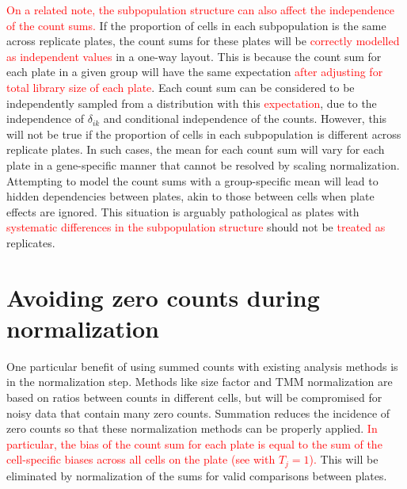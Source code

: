 \documentclass{article}
\newcommand\revised[1]{\textcolor{red}{#1}}
\begin{document}
\revised{On a related note, the subpopulation structure can also affect the independence of the count sums.}
If the proportion of cells in each subpopulation is the same across replicate plates, the count sums for these plates will be \revised{correctly modelled as independent values} in a one-way layout.
This is because the count sum for each plate in a given group will have the same expectation \revised{after adjusting for total library size of each plate}.
Each count sum can be considered to be independently sampled from a distribution with this \revised{expectation}, due to the independence of $\delta_{ik}$ and conditional independence of the counts.
However, this will not be true if the proportion of cells in each subpopulation is different across replicate plates.
In such cases, the mean for each count sum will vary for each plate in a gene-specific manner that cannot be resolved by scaling normalization.
Attempting to model the count sums with a group-specific mean will lead to hidden dependencies between plates, akin to those between cells when plate effects are ignored.
This situation is arguably pathological as plates with \revised{systematic differences in the subpopulation structure} should not be \revised{treated as} replicates.


\section{Avoiding zero counts during normalization}
One particular benefit of using summed counts with existing analysis methods is in the normalization step.
Methods like size factor and TMM normalization are based on ratios between counts in different cells, but will be compromised for noisy data that contain many zero counts.
Summation reduces the incidence of zero counts so that these normalization methods can be properly applied.
\revised{In particular, the bias of the count sum for each plate is equal to the sum of the cell-specific biases across all cells on the plate (see \cite{lun2016pooling} with $T_j=1$).}
This will be eliminated by normalization of the sums for valid comparisons between plates.
\end{document}
